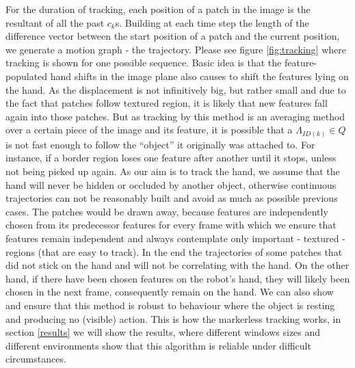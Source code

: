 For the duration of tracking, each position of a patch in the image is the resultant of all the past $c_k$s. Building at each time step the length of the difference vector between the start position of a patch and the current position, we generate a motion graph - the trajectory. Please see figure \ref{fig:tracking} where tracking is shown for one possible sequence.
Basic idea is that the feature-populated hand shifts in the image plane also causes to shift the features lying on the hand. As the displacement is not infinitively big, but rather small and due to the fact that patches follow textured region, it is likely that new features fall again into those patches. But as tracking by this method is an averaging method over a certain piece of the image and its feature, it is possible that a $\Lambda_{ID\left( k \right) } \in Q$ is not fast enough to follow the ``object'' it originally was attached to. For instance, if a border region loses one feature after another until it stops, unless not being picked up again. As our aim is to track the hand, we assume that the hand will never be hidden or occluded by another object, otherwise continuous trajectories can not be reasonably built and avoid as much as possible previous cases.  The patches would be drawn away, because features are independently chosen from its predecessor features for every frame with which we ensure that features remain independent and always contemplate only important - textured - regions (that are easy to track). In the end the trajectories of some patches that did not stick on the hand and will not be correlating with the hand. On the other hand, if there have been chosen features on the robot's hand, they will likely been chosen in the next frame, consequently remain on the hand. We can also show and ensure that this method is robust to behaviour where the object is resting and producing no (visible) action. This is how the markerless tracking works, in section \ref{results} we will show the results, where different windows sizes and different environments show that this algorithm is reliable under difficult circumstances. 

